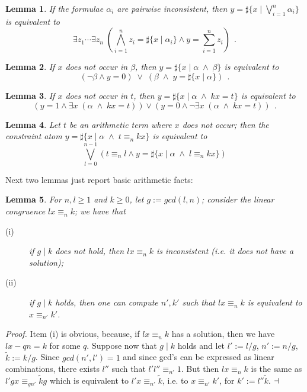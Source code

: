 \documentclass[11pt,a4paper]{article}
\newtheorem{lemma}{Lemma}
\begin{document}
{\begin{lemma}\label{lem:pairwise} If the formulae $\alpha_i$ are pairwise inconsistent, then 
 $y=\sharp\{ x\mid \bigvee_{i=1}^n\alpha_i\}$ is equivalent to
 $$
 \exists z_1\cdots \exists z_n \;(\bigwedge_{i=1}^n z_i=\sharp\{ x\mid \alpha_i\} \wedge y= \sum_{i=1}^n z_i)~~.
 $$
\end{lemma}

\begin{lemma}\label{lem:independent}
 If $x$ does not occur in $\beta$, then $y=\sharp\{ x\mid \alpha\;\wedge\; \beta\}$ is equivalent to
 $$
 (\neg \beta \wedge y=0)\;\vee\; (\beta \;\wedge\; y=\sharp\{ x\mid \alpha\})~~.
 $$
\end{lemma}

\begin{lemma}\label{lem:unique}
 If $x$ does not occur in $t$, then $y=\sharp\{ x\mid \alpha\;\wedge\; kx=t\}$ is equivalent to
 $$
 (y=1 \wedge \exists x\;(\alpha\;\wedge\; kx=t)) \vee (y=0 \wedge\neg \exists x\;(\alpha\;\wedge\; kx=t))~~.
 $$
\end{lemma}

\begin{lemma}\label{lem:c}
 Let $t$ be an arithmetic term where $x$ does not occur; then the constraint atom  $y=\sharp\{ x\mid \alpha\;\wedge\; t\equiv_n kx\}$ is equivalent to
 $$
 \bigvee_{l=0}^{n-1} (t\equiv_n l \wedge y=\sharp\{ x\mid \alpha\;\wedge\; l\equiv_n kx\})
 $$
\end{lemma}

Next two lemmas just report basic arithmetic facts:


\begin{lemma}\label{lem:congruence}
 For $n, l\geq 1$ and $k\geq 0$, let $g:=gcd(l,n)$; consider the linear congruence  $lx\equiv_n k$; we have that
 \begin{description}
  \item[{\rm (i)}] if $g\mid k$ does not hold, then $lx\equiv_n k$ is inconsistent (i.e. it does not have a solution);
  \item[{\rm (ii)}] if $g\mid k$ holds, then one can compute $n', k'$ such that
 $lx\equiv_n k$ is equivalent to $x\equiv_{n'} k'$.
 \end{description}
\end{lemma}

\noindent
\textit{Proof.}
Item (i) is obvious, because, if 
$lx\equiv_n k$ has a solution, then we have $lx-qn=k$ for some $q$. Suppose now that  $g\mid k$ holds and
 let $l':=l/g$, $n':=n/g$, $\tilde k:=k/g$. Since $gcd(n',l')=1$ and since gcd's can be expressed as linear combinations, there exists $l''$ such that $l'l''\equiv_{n'} 1$.
  But then $lx\equiv_n k$  is the same as 
 $l'gx\equiv_{gn'} \tilde k g$ which is equivalent to $l'x\equiv_{n'} \tilde k$, i.e. to $x\equiv_{n'} k'$, for $k':=l''\tilde k$.
 $\hfill\dashv$



}
\end{document}
